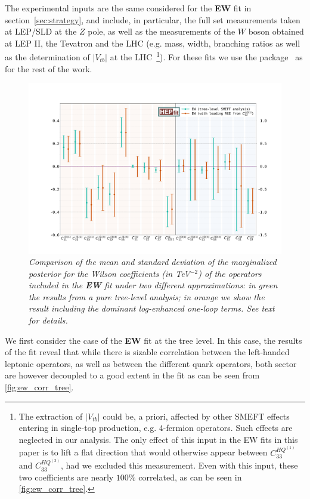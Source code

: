 The experimental inputs are the same considered for the {\bf EW} fit in section~\ref{sec:strategy}, and include, in particular, the full set measurements taken at LEP/SLD at the $Z$ pole, as well as the measurements of the $W$ boson obtained at LEP II, the Tevatron and the LHC (e.g. mass, width, branching ratios as well as the determination of $\left|V_{tb}\right|$ at the LHC~\footnote{The extraction of $\left|V_{tb}\right|$ could be, a priori, affected by other SMEFT effects entering in single-top production, e.g. 4-fermion operators. Such effects are neglected in our  analysis. The only effect of this input in the EW fits in this paper is to lift a flat direction that would otherwise appear between $C^{HQ^{(1)}}_{33}$ and $C^{HQ^{(3)}}_{33}$, had we excluded this measurement. Even with this input, these two coefficients are nearly $100\%$ correlated, as can be seen in \autoref{fig:ew_corr_tree}.}). For these fits we use the \HEPfit package~\cite{deBlas:2019okz} as for the rest of the work. 

\begin{figure}[t]
	\centering
	\includegraphics[width=\textwidth]{figures/errorbar_EW.pdf}
	\caption{\it Comparison of the mean and standard deviation of the marginalized posterior for the Wilson coefficients (in TeV$^{-2}$) of the operators included in the {\bf EW} fit under two different approximations: in green the results from a pure tree-level analysis; in orange we show the result including the dominant log-enhanced one-loop terms. See text for details. }
	\label{fig:ew_bounds}
\end{figure}

We first consider the case of the {\bf EW} fit at the tree level. In this case, the results of the fit reveal that while there is sizable correlation between the left-handed leptonic operators, as well as between the different quark operators, both sector are however decoupled to a good extent in the fit as can be seen from \autoref{fig:ew_corr_tree}.

